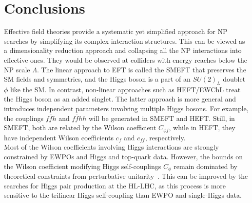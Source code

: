 \section{Conclusions \label{sec:concefts}}
Effective field theories provide a systematic yet simplified approach for NP searches by simplifying its complex interaction structures. This can be viewed as a dimensionality reduction approach and collapsing all the NP interactions into effective ones. They would be observed at colliders with energy reaches below the NP scale $\Lambda$. The linear approach to EFT is called the SMEFT that preserves the SM fields and symmetries, and the Higgs boson is a part of an $SU(2)_L$ doublet $\phi$ like the SM. In contrast, non-linear approaches such as HEFT/EWChL treat the Higgs boson as an added singlet. The latter approach is more general and introduces independent parameters involving multiple Higgs bosons. For example, the couplings $f\bar f h$ and $ f\bar f hh$ will be generated in SMEFT and HEFT. Still, in SMEFT, both are related by the Wilson coefficient $C_{\phi f}$, while in HEFT, they have independent  Wilson coefficients $c_f$ and $c_{ff}$, respectively. \\  Most of the Wilson coefficients involving Higgs interactions are strongly constrained by EWPOs and Higgs and top-quark data. However, the bounds on the Wilson coefficient modifying Higgs self-couplings $C_\phi$ remain dominated by theoretical constraints from perturbative unitarity~\cite{DiLuzio:2017tfn,DiVita:2017vrr}. This can be improved by the searches for Higgs pair production at the HL-LHC, as this process is more sensitive to the trilinear Higgs self-coupling than EWPO and single-Higgs data.
